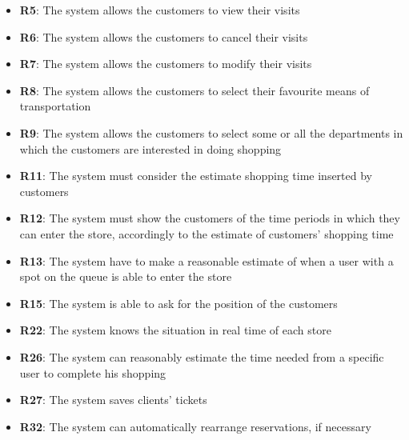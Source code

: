 \documentclass{article}
\begin{document}
\begin{center}
\begin{itemize}
						
						\item {\bfseries R5}: The system allows the customers to view their visits
						\item {\bfseries R6}: The system allows the customers to cancel their visits
						\item {\bfseries R7}: The system allows the customers to modify their visits		
						\item {\bfseries R8}: The system allows the customers to select their favourite means of transportation
						\item {\bfseries R9}: The system allows the customers to select some or all the departments in which the customers are interested in doing shopping
						\item {\bfseries R11}: The system must consider the estimate shopping time inserted by customers
						\item {\bfseries R12}: The system must show the customers of the time periods in which they can enter the
						store, accordingly to the estimate of customers' shopping time
						\item {\bfseries R13}: The system have to make a reasonable estimate of when a user with a spot	on the queue is able to enter the store
						\item {\bfseries R15}: The system is able to ask for the position of the customers
						\item {\bfseries R22}: The system knows the situation in real time of each store
						\item {\bfseries R26}: The system can reasonably estimate the time needed from a specific user to complete his shopping
						\item {\bfseries R27}: The system saves clients' tickets
						\item{\bfseries R32}: The system can automatically rearrange reservations, if necessary

					\end{itemize}
				

				\end{center}
			\newpage
\end{document}
